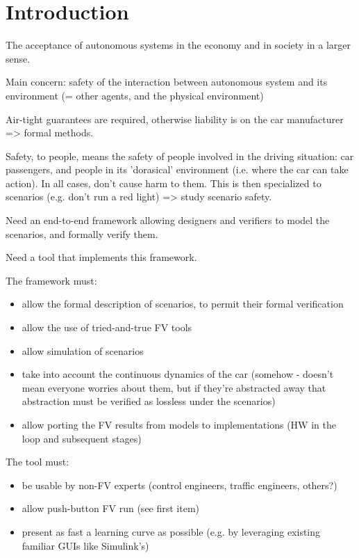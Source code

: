 \section{Introduction}
\label{introduction}


The acceptance of autonomous systems in the economy and in society in a larger sense.

Main concern: safety of the interaction between autonomous system and its environment (= other agents, and the physical environment)

Air-tight guarantees are required, otherwise liability is on the car manufacturer => formal methods.

Safety, to people, means the safety of people involved in the driving situation: car passengers, and people in its 'dorasical' environment (i.e. where the car can take action). 
In all cases, don't cause harm to them. 
This is then specialized to scenarios (e.g. don't run a red light) => study scenario safety.

Need an end-to-end framework allowing designers and verifiers to model the scenarios, and formally verify them.


Need a tool that implements this framework.

The framework must: 
\begin{itemize}
\item allow the formal description of scenarios, to permit their formal verification
\item allow the use of tried-and-true FV tools
\item allow simulation of scenarios
\item take into account the continuous dynamics of the car (somehow - doesn't mean everyone worries about them, but if they're abstracted away that abstraction must be verified as lossless under the scenarios)
\item allow porting the FV results from models to implementations (HW in the loop and subsequent stages)
\end{itemize}

The tool must:
\begin{itemize}
	\item be usable by non-FV experts (control engineers, traffic engineers, others?)
	\item allow push-button FV run (see first item)
	\item present as fast a learning curve as possible (e.g. by leveraging existing familiar GUIs like Simulink's)
\end{itemize}

